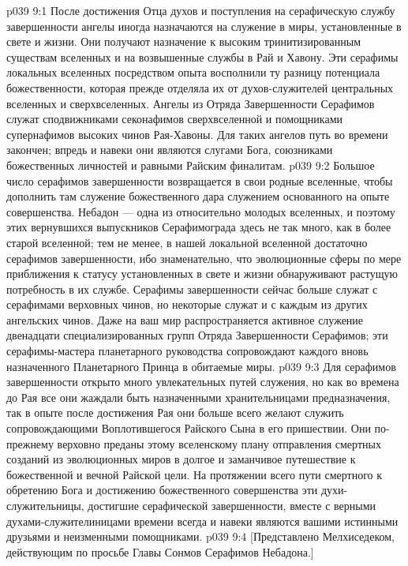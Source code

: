 \vs p039 9:1 После достижения Отца духов и поступления на серафическую службу завершенности ангелы иногда назначаются на служение в миры, установленные в свете и жизни. Они получают назначение к высоким тринитизированным существам вселенных и на возвышенные службы в Рай и Хавону. Эти серафимы локальных вселенных посредством опыта восполнили ту разницу потенциала божественности, которая прежде отделяла их от духов\hyp{}служителей центральных вселенных и сверхвселенных. Ангелы из Отряда Завершенности Серафимов служат сподвижниками секонафимов сверхвселенной и помощниками супернафимов высоких чинов Рая\hyp{}Хавоны. Для таких ангелов путь во времени закончен; впредь и навеки они являются слугами Бога, союзниками божественных личностей и равными Райским финалитам.
\vs p039 9:2 Большое число серафимов завершенности возвращается в свои родные вселенные, чтобы дополнить там служение божественного дара служением основанного на опыте совершенства. Небадон --- одна из относительно молодых вселенных, и поэтому этих вернувшихся выпускников Серафимограда здесь не так много, как в более старой вселенной; тем не менее, в нашей локальной вселенной достаточно серафимов завершенности, ибо знаменательно, что эволюционные сферы по мере приближения к статусу установленных в свете и жизни обнаруживают растущую потребность в их службе. Серафимы завершенности сейчас больше служат с серафимами верховных чинов, но некоторые служат и с каждым из других ангельских чинов. Даже на ваш мир распространяется активное служение двенадцати специализированных групп Отряда Завершенности Серафимов; эти серафимы\hyp{}мастера планетарного руководства сопровождают каждого вновь назначенного Планетарного Принца в обитаемые миры.
\vs p039 9:3 Для серафимов завершенности открыто много увлекательных путей служения, но как во времена до Рая все они жаждали быть назначенными хранительницами предназначения, так в опыте после достижения Рая они больше всего желают служить сопровождающими Воплотившегося Райского Сына в его пришествии. Они по\hyp{}прежнему верховно преданы этому вселенскому плану отправления смертных созданий из эволюционных миров в долгое и заманчивое путешествие к божественной и вечной Райской цели. На протяжении всего пути смертного к обретению Бога и достижению божественного совершенства эти духи\hyp{}служительницы, достигшие серафической завершенности, вместе с верными духами\hyp{}служителиницами времени всегда и навеки являются вашими истинными друзьями и неизменными помощниками.
\vs p039 9:4 [Представлено Мелхиседеком, действующим по просьбе Главы Сонмов Серафимов Небадона.]

